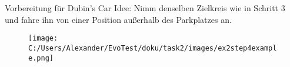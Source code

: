 \begin{frame}{Vorbereitung für Dubin's Car}
	Idee: Nimm denselben Zielkreis wie in Schritt 3 und fahre ihn von einer Position außerhalb des Parkplatzes an.
	
	
	\begin{figure}
		\centering
			\texttt{[image: C:/Users/Alexander/EvoTest/doku/task2/images/ex2step4example.png]}
		\label{fig:ex2step4example}
	\end{figure}
	
\end{frame}